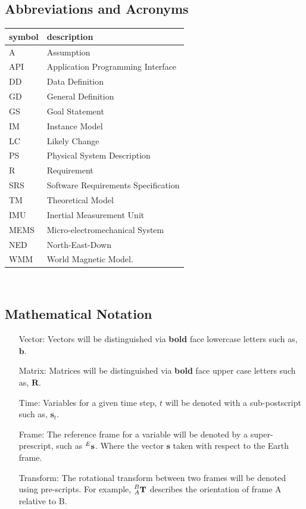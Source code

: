 \documentclass[12pt]{article}
\begin{document}
\subsection{Abbreviations and Acronyms}

\renewcommand{\arraystretch}{1.2}
\begin{tabular}{l l}
  \toprule
  \textbf{symbol} & \textbf{description}\\
  \midrule
  A & Assumption\\
  API & Application Programming Interface \\
  DD & Data Definition\\
  GD & General Definition\\
  GS & Goal Statement\\
  IM & Instance Model\\
  LC & Likely Change\\
  PS & Physical System Description\\
  R & Requirement\\
  SRS & Software Requirements Specification\\
  TM & Theoretical Model\\
  IMU & Inertial Measurement Unit\\
  MEMS & Micro-electromechanical System \\
  NED & North-East-Down \\
  WMM & World Magnetic Model. \\
  \bottomrule
\end{tabular}\\


\subsection{Mathematical Notation}

\begin{itemize}
  \item[Vector:] Vectors will be distinguished via \textbf{bold} face lowercase letters such as,
  $\mathbf{b}$.
  \item[Matrix:] Matrices will be distinguished via \textbf{bold} face upper case letters such as,
  $\mathbf{R}$.
  \item[Time:] Variables for a given time step, $t$ will be denoted with a sub-postscript such as,
  $\mathbf{s}_t$.
  \item[Frame:] The reference frame for a variable will be denoted by a super-prescript, such as
  $\prescript{E}{}{\mathbf{s}}$. Where the vector $\mathbf{s}$ taken with respect to the Earth
  frame.
  \item[Transform:] The rotational transform between two frames will be denoted using pre-scripts.
  For example, $\prescript{B}{A}{\mathbf{T}}$ describes the orientation of frame A relative to B.
\end{itemize}
\end{document}
